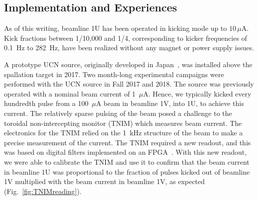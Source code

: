 \documentclass[aps,prab,twocolumn,superscriptaddress]{revtex4-1}
\begin{document}
\subsection{Implementation and Experiences}
\label{sec:experiences}








As of this writing, beamline 1U has been operated in kicking mode up to $10 \, \mu$A.
Kick fractions between 1/10,000 and 1/4, corresponding to kicker frequencies of 0.1~Hz to 282~Hz, have been realized without any magnet or power supply issues.

A prototype UCN source, originally developed in Japan~\cite{PhysRevLett.108.134801}, was installed above the spallation target in 2017. 
Two month-long experimental campaigns were performed with the UCN source in Fall 2017 and 2018. 
The source was previously operated with a nominal beam current of 1~$\mu$A. Hence, we typically kicked every hundredth pulse from a 100~$\mu$A beam in beamline 1V, into 1U, to achieve this current. The relatively sparse pulsing of the beam posed a challenge to the toroidal non-intercepting monitor (TNIM) which measures beam current.  The electronics for the TNIM relied on the 1~kHz structure of the beam to make a precise measurement of the current.
The TNIM required a new readout, and this was based on digital filters implemented on an FPGA~\cite{bib:rawnsley}.
With this new readout, we were able to calibrate the TNIM and use it to confirm that the beam current in beamline 1U was proportional to the fraction of pulses kicked out of beamline 1V multiplied with the beam current in beamline 1V, as expected (Fig.~\ref{fig:TNIMreading}).
\end{document}

